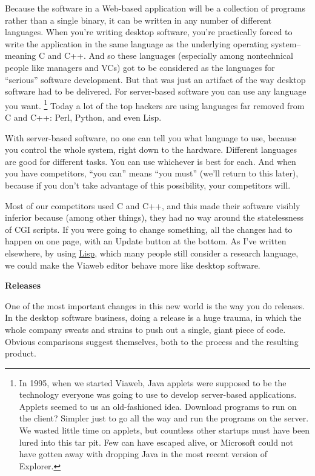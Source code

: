 \documentclass[12pt]{book}
\begin{document}
Because the software in a Web-based application will be a collection of
programs rather than a single binary, it can be written in any number of
different languages. When you're writing desktop software, you're
practically forced to write the application in the same language as the
underlying operating system-- meaning C and C++. And so these languages
(especially among nontechnical people like managers and VCs) got to be
considered as the languages for ``serious'' software development. But
that was just an artifact of the way desktop software had to be
delivered. For server-based software you can use any language you want.
\footnote{In 1995, when we started Viaweb, Java applets were supposed to
be the technology everyone was going to use to develop server-based
applications. Applets seemed to us an old-fashioned idea. Download
programs to run on the client? Simpler just to go all the way and run
the programs on the server. We wasted little time on applets, but
countless other startups must have been lured into this tar pit. Few can
have escaped alive, or Microsoft could not have gotten away with
dropping Java in the most recent version of Explorer.} Today a lot of the top hackers are using languages far removed
from C and C++: Perl, Python, and even Lisp.

With server-based software, no one can tell you what language to use,
because you control the whole system, right down to the hardware.
Different languages are good for different tasks. You can use whichever
is best for each. And when you have competitors, ``you can'' means ``you
must'' (we'll return to this later), because if you don't take advantage
of this possibility, your competitors will.

Most of our competitors used C and C++, and this made their software
visibly inferior because (among other things), they had no way around
the statelessness of CGI scripts. If you were going to change something,
all the changes had to happen on one page, with an Update button at the
bottom. As I've written elsewhere, by using \href{avg.html}{Lisp}, which
many people still consider a research language, we could make the Viaweb
editor behave more like desktop software.

\textbf{Releases}

One of the most important changes in this new world is the way you do
releases. In the desktop software business, doing a release is a huge
trauma, in which the whole company sweats and strains to push out a
single, giant piece of code. Obvious comparisons suggest themselves,
both to the process and the resulting product.
\end{document}
